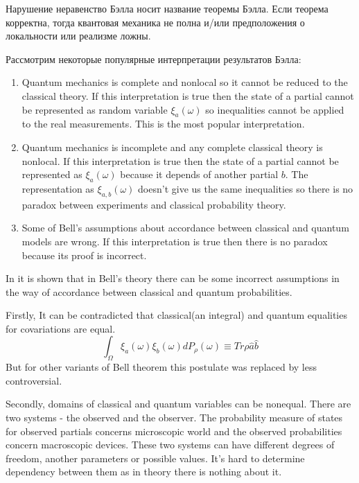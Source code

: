 \documentclass[11pt]{article}
\begin{document}
Нарушение неравенство Бэлла носит название теоремы Бэлла. Если теорема корректна, тогда квантовая механика не полна и/или предположения о локальности или реализме ложны. 

Рассмотрим некоторые популярные интерпретации результатов Бэлла:
\begin{enumerate}
\item Quantum mechanics is complete and nonlocal so it cannot be reduced to the classical theory.
If this interpretation is true then the state of a partial cannot be represented as random variable $\xi_a(\omega)$ so inequalities cannot be applied to the real measurements. This is the most popular interpretation.

\item Quantum mechanics is incomplete and any complete classical theory is nonlocal.
If this interpretation is true then the state of a partial cannot be represented as $\xi_a(\omega)$ because it depends of another partial $b$. The representation as $\xi_{a,b}(\omega)$ doesn't give us the same inequalities so there is no paradox between experiments and classical probability theory.

\item Some of Bell's assumptions about accordance between classical and quantum models are wrong. If this interpretation is true then there is no paradox because its proof is incorrect.
\end{enumerate}

In \cite{Khrennikov_information} it is shown that in Bell's theory there can be some incorrect assumptions in the way of accordance between classical and quantum probabilities.

Firstly, It can be contradicted that classical(an integral) and quantum equalities for covariations are equal.
$$\int_\Omega\xi_a(\omega)\xi_b(\omega)dP_\rho(\omega) \equiv Tr\rho\hat{a}\hat{b}$$
But for other variants of Bell theorem this postulate was replaced by less controversial.

Secondly, domains of classical and quantum variables can be nonequal. There are two systems - the observed and the observer. The probability measure of states for observed partials concerns microscopic world and the observed probabilities concern macroscopic devices. These two systems can have different degrees of freedom, another parameters or possible values. It's hard to determine dependency between them as in theory there is nothing about it.
\end{document}

